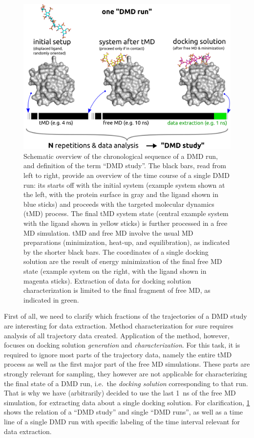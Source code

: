 \begin{figure}
\centering
\includegraphics[width=1.0\textwidth]{gfx/dmd/dmd_timeline_for_thesis_09.png}
\caption[]{
Schematic overview of the chronological sequence of a DMD run, and definition of
the term \enquote{DMD study}. The black bars, read from left to right, provide
an overview of the time course of a single DMD run: its starts off with the
initial system (example system shown at the left, with the protein surface in
gray and the ligand shown in blue sticks) and proceeds with the targeted
molecular dynamics (tMD) process. The final tMD system state (central example
system with the ligand shown in yellow sticks) is further processed in a free MD
simulation. tMD and free MD involve the usual MD preparations (minimization,
heat-up, and equilibration), as indicated by the shorter black bars. The
coordinates of a single docking solution are the result of energy minimization
of the final free MD state (example system on the right, with the ligand shown
in magenta sticks). Extraction of data for docking solution characterization is
limited to the final fragment of free MD, as indicated in green.}
\label{fig:dmd:timeline}
\end{figure}


First of all, we need to clarify which fractions of the trajectories of a DMD
study are interesting for data extraction. Method characterization for sure
requires analysis of all trajectory data created. Application of the method,
however, focuses on docking solution \textit{generation} and
\textit{characterization}. For this task, it is required to ignore most parts of
the trajectory data, namely the entire tMD process as well as the first major
part of the free MD simulations. These parts are strongly relevant for sampling,
they however are not applicable for characterizing the final state of a DMD run,
i.e.\ the \textit{docking solution} corresponding to that run. That is why we
have (arbitrarily) decided to use the last \SI{1}{\nano\second} of the free MD
simulation, for extracting data about a single docking solution. For
clarification, \cref{fig:dmd:timeline} shows the relation of a \enquote{DMD
study} and single \enquote{DMD runs}, as well as a time line of a single DMD run
with specific labeling of the time interval relevant for data extraction.

